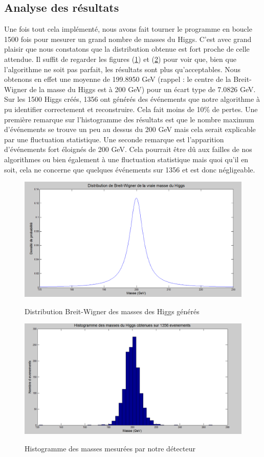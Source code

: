\documentclass[11pt]{article}
\begin{document}
\newpage
\subsection{Analyse des résultats}

Une fois tout cela implémenté, nous avons fait tourner le programme en boucle
1500 fois pour mesurer un grand nombre de masses du Higgs. C'est avec grand
plaisir que nous constatons que la distribution obtenue est fort proche de celle
attendue. Il suffit de regarder les figures (\ref{bw}) et (\ref{hist}) pour voir
que, bien que l'algorithme ne soit pas parfait, les résultats sont plus
qu'acceptables. Nous obtenons en effet une moyenne de 199.8950 GeV (rappel : le
centre de la Breit-Wigner de la masse du Higgs est à 200 GeV) pour un
écart type de 7.0826 GeV. Sur les 1500 Higgs créés, 1356 ont générés des
événements que notre algorithme à pu identifier correctement et reconstruire.
Cela fait moins de 10\% de pertes. Une première remarque sur l'histogramme des
résultats est que le nombre maximum d'événements se trouve un peu au dessus du
200 GeV mais cela serait explicable par une fluctuation statistique. Une seconde
remarque est l'apparition d'événements fort éloignés de 200 GeV. Cela pourrait
être dû aux failles de nos algorithmes ou bien également à une fluctuation
statistique mais quoi qu'il en soit, cela ne concerne que quelques événements
sur 1356 et est donc négligeable.

\begin{figure}[p]
\caption{Distribution Breit-Wigner des masses des Higgs générés}
\includegraphics[scale=0.4]{images/bwmH.png}
\label{bw}
\end{figure}

\begin{figure}[p]
\caption{Histogramme des masses mesurées par notre détecteur}
\includegraphics[scale=0.4]{images/histmH.png}
\label{hist}
\end{figure}
\end{document}
